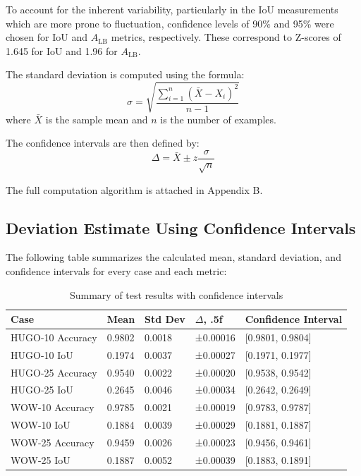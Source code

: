 \documentclass[12pt,a4paper]{article}
\begin{document}
To account for the inherent variability, particularly in the IoU measurements which are more prone to fluctuation, confidence levels of 90\% and 95\% were chosen for IoU and \( A_{\text{LB}} \) metrics, respectively. These correspond to Z-scores of 1.645 for IoU and 1.96 for \( A_{\text{LB}} \).

The standard deviation is computed using the formula:
\[
\sigma = \sqrt{\frac{\sum_{i=1}^{n} (\bar{X} - X_i)^2}{n-1}}
\]
where $\bar{X}$ is the sample mean and $n$ is the number of examples.

The confidence intervals are then defined by:
\[
\Delta = \bar{X} \pm z \frac{\sigma}{\sqrt{n}}
\]

The full computation algorithm is attached in Appendix B.

\subsection{Deviation Estimate Using Confidence Intervals}

The following table summarizes the calculated mean, standard deviation, and confidence intervals for every case and each metric:

\begin{table}[h]
\centering
\begin{tabular}{@{}lllll@{}}
\toprule
Case & Mean & Std Dev & $\Delta$, .5f & Confidence Interval \\ \midrule
HUGO-10 Accuracy & 0.9802 & 0.0018 & ±0.00016 & [0.9801, 0.9804] \\
HUGO-10 IoU & 0.1974 & 0.0037 & ±0.00027 & [0.1971, 0.1977] \\
HUGO-25 Accuracy & 0.9540 & 0.0022 & ±0.00020 & [0.9538, 0.9542] \\
HUGO-25 IoU & 0.2645 & 0.0046 & ±0.00034 & [0.2642, 0.2649] \\
WOW-10 Accuracy & 0.9785 & 0.0021 & ±0.00019 & [0.9783, 0.9787] \\
WOW-10 IoU & 0.1884 & 0.0039 & ±0.00029 & [0.1881, 0.1887] \\
WOW-25 Accuracy & 0.9459 & 0.0026 & ±0.00023 & [0.9456, 0.9461] \\
WOW-25 IoU & 0.1887 & 0.0052 & ±0.00039 & [0.1883, 0.1891] \\ \bottomrule
\end{tabular}
\caption{Summary of test results with confidence intervals}
\end{table}
\end{document}
